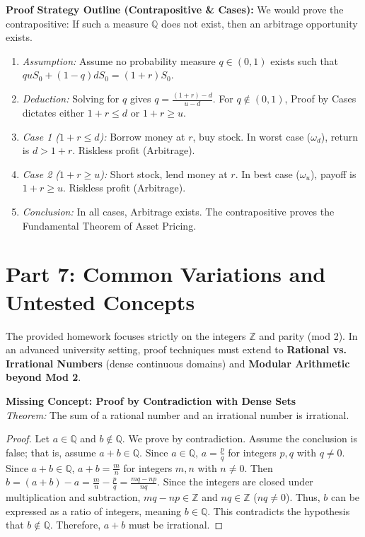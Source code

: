 \documentclass[11pt, letterpaper]{article}
\theoremstyle{definition}
\theoremstyle{remark}
\newcommand{\Z}{\mathbb{Z}}
\newcommand{\Q}{\mathbb{Q}}
\begin{document}
\textbf{Proof Strategy Outline (Contrapositive \& Cases):}
We would prove the contrapositive: If such a measure $\mathbb{Q}$ does not exist, then an arbitrage opportunity exists.
\begin{enumerate}
    \item \textit{Assumption:} Assume no probability measure $q \in (0,1)$ exists such that $q u S_0 + (1-q) d S_0 = (1+r)S_0$.
    \item \textit{Deduction:} Solving for $q$ gives $q = \frac{(1+r)-d}{u-d}$. For $q \notin (0,1)$, Proof by Cases dictates either $1+r \le d$ or $1+r \ge u$.
    \item \textit{Case 1 ($1+r \le d$):} Borrow money at $r$, buy stock. In worst case ($\omega_d$), return is $d > 1+r$. Riskless profit (Arbitrage).
    \item \textit{Case 2 ($1+r \ge u$):} Short stock, lend money at $r$. In best case ($\omega_u$), payoff is $1+r \ge u$. Riskless profit (Arbitrage).
    \item \textit{Conclusion:} In all cases, Arbitrage exists. The contrapositive proves the Fundamental Theorem of Asset Pricing.
\end{enumerate}

\newpage

\section{Part 7: Common Variations and Untested Concepts}

The provided homework focuses strictly on the integers $\Z$ and parity (mod 2). In an advanced university setting, proof techniques must extend to \textbf{Rational vs. Irrational Numbers} (dense continuous domains) and \textbf{Modular Arithmetic beyond Mod 2}.

\textbf{Missing Concept: Proof by Contradiction with Dense Sets} \\
\textit{Theorem:} The sum of a rational number and an irrational number is irrational.
\begin{proof}
Let $a \in \Q$ and $b \notin \Q$. We prove by contradiction. Assume the conclusion is false; that is, assume $a+b \in \Q$.
Since $a \in \Q$, $a = \frac{p}{q}$ for integers $p,q$ with $q \neq 0$.
Since $a+b \in \Q$, $a+b = \frac{m}{n}$ for integers $m,n$ with $n \neq 0$.
Then $b = (a+b) - a = \frac{m}{n} - \frac{p}{q} = \frac{mq - np}{nq}$.
Since the integers are closed under multiplication and subtraction, $mq - np \in \Z$ and $nq \in \Z$ ($nq \neq 0$).
Thus, $b$ can be expressed as a ratio of integers, meaning $b \in \Q$.
This contradicts the hypothesis that $b \notin \Q$. Therefore, $a+b$ must be irrational.
\end{proof}
\end{document}
